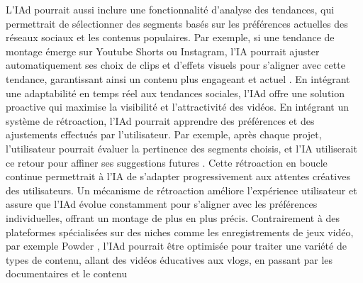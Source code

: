 \documentclass[livre]{udes-genie-these}
\begin{document}
L'IAd pourrait aussi inclure une fonctionnalité d'analyse des tendances, qui permettrait de sélectionner des segments basés sur les préférences actuelles des réseaux sociaux et les contenus populaires. Par exemple, si une tendance de montage émerge sur Youtube Shorts ou Instagram, l'IA pourrait ajuster automatiquement ses choix de clips et d'effets visuels pour s'aligner avec cette tendance, garantissant ainsi un contenu plus engageant et actuel \cite{captions2024}\cite{opusclip2024}\cite{framedrop2024}\cite{sendshort2024}. En intégrant une adaptabilité en temps réel aux tendances sociales, l'IAd offre une solution proactive qui maximise la visibilité et l'attractivité des vidéos.
En intégrant un système de rétroaction, l'IAd pourrait apprendre des préférences et des ajustements effectués par l'utilisateur. Par exemple, après chaque projet, l'utilisateur pourrait évaluer la pertinence des segments choisis, et l'IA utiliserait ce retour pour affiner ses suggestions futures \cite{descript2024}\cite{munch2024}\cite{recast2024}. Cette rétroaction en boucle continue permettrait à l'IA de s'adapter progressivement aux attentes créatives des utilisateurs. Un mécanisme de rétroaction améliore l'expérience utilisateur et assure que l'IAd évolue constamment pour s'aligner avec les préférences individuelles, offrant un montage de plus en plus précis.
Contrairement à des plateformes spécialisées sur des niches comme les enregistrements de jeux vidéo, par exemple Powder \cite{powder2024}, l'IAd pourrait être optimisée pour traiter une variété de types de contenu, allant des vidéos éducatives aux vlogs, en passant par les documentaires et le contenu
\end{document}
